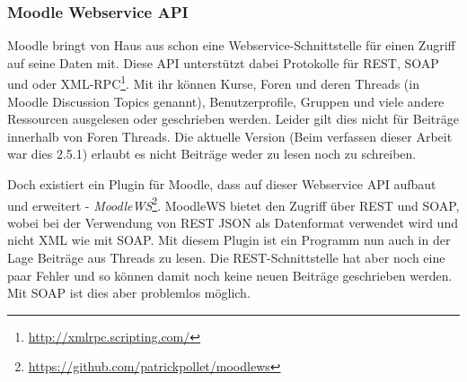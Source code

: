 
\subsubsection{Moodle Webservice API} %
\label{ssub:moodle_webservice}

Moodle bringt von Haus aus schon eine Webservice-Schnittstelle für einen Zugriff auf seine Daten mit. Diese API unterstützt dabei Protokolle für REST, SOAP und oder XML-RPC\footnote{\url{http://xmlrpc.scripting.com/}}. Mit ihr können Kurse, Foren und deren Threads (in Moodle Discussion Topics genannt), Benutzerprofile, Gruppen und viele andere Ressourcen ausgelesen oder geschrieben werden. Leider gilt dies nicht für Beiträge innerhalb von Foren Threads. Die aktuelle Version (Beim verfassen dieser Arbeit war dies 2.5.1) erlaubt es nicht Beiträge weder zu lesen noch zu schreiben.

Doch existiert ein Plugin für Moodle, dass auf dieser Webservice API aufbaut und erweitert - \emph{MoodleWS}\footnote{\url{https://github.com/patrickpollet/moodlews}}. MoodleWS bietet den Zugriff über REST und SOAP, wobei bei der Verwendung von REST JSON als Datenformat verwendet wird und nicht XML wie mit SOAP. Mit diesem Plugin ist ein Programm nun auch in der Lage Beiträge aus Threads zu lesen. Die REST-Schnittstelle hat aber noch eine paar Fehler und so können damit noch keine neuen Beiträge geschrieben werden. Mit SOAP ist dies aber problemlos möglich.

